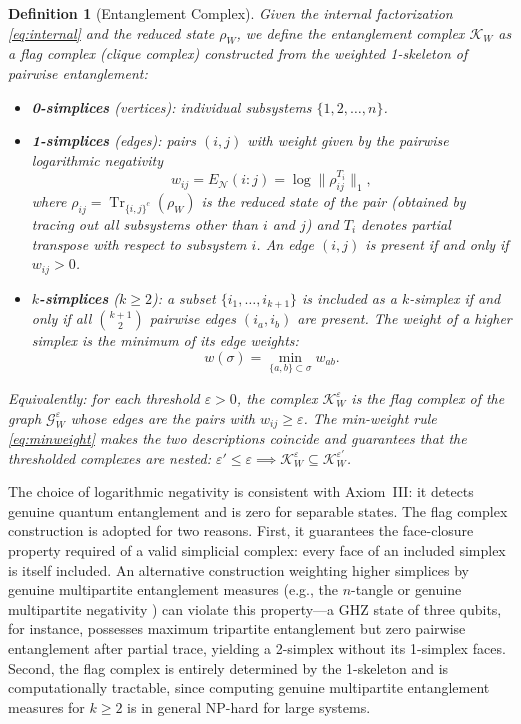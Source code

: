 \documentclass[11pt, a4paper]{article}
\newtheorem{definition}{Definition}
\begin{document}
\begin{definition}[Entanglement Complex]
\label{def:KW}
Given the internal factorization \eqref{eq:internal} and the reduced state $\rho_W$, we define the \emph{entanglement complex} $\mathcal{K}_W$ as a \emph{flag complex} (clique complex) constructed from the weighted 1-skeleton of pairwise entanglement:
\begin{itemize}
    \item \textbf{0-simplices} (vertices): individual subsystems $\{1, 2, \ldots, n\}$.
    \item \textbf{1-simplices} (edges): pairs $(i,j)$ with weight given by the pairwise logarithmic negativity
    \begin{equation}
    w_{ij} = E_{\mathcal{N}}(i{:}j) = \log \bigl\lVert \rho_{ij}^{T_i} \bigr\rVert_1,
    \label{eq:negativity}
    \end{equation}
    where $\rho_{ij} = \operatorname{Tr}_{\{i,j\}^c}(\rho_W)$ is the reduced state of the pair (obtained by tracing out all subsystems other than $i$ and $j$) and $T_i$ denotes partial transpose with respect to subsystem $i$. An edge $(i,j)$ is present if and only if $w_{ij} > 0$.
    \item \textbf{$k$-simplices} ($k \geq 2$): a subset $\{i_1, \ldots, i_{k+1}\}$ is included as a $k$-simplex if and only if all $\binom{k+1}{2}$ pairwise edges $(i_a, i_b)$ are present. The weight of a higher simplex is the minimum of its edge weights:
    \begin{equation}
    w(\sigma) = \min_{\{a,b\} \subset \sigma} w_{ab}.
    \label{eq:minweight}
    \end{equation}
\end{itemize}
Equivalently: for each threshold $\varepsilon > 0$, the complex $\mathcal{K}_W^\varepsilon$ is the flag complex of the graph $\mathcal{G}_W^\varepsilon$ whose edges are the pairs with $w_{ij} \geq \varepsilon$. The min-weight rule \eqref{eq:minweight} makes the two descriptions coincide and guarantees that the thresholded complexes are nested: $\varepsilon' \leq \varepsilon \implies \mathcal{K}_W^\varepsilon \subseteq \mathcal{K}_W^{\varepsilon'}$.
\end{definition}

The choice of logarithmic negativity is consistent with Axiom~III: it detects genuine quantum entanglement and is zero for separable states. The flag complex construction is adopted for two reasons. First, it guarantees the face-closure property required of a valid simplicial complex: every face of an included simplex is itself included. An alternative construction weighting higher simplices by genuine multipartite entanglement measures (e.g., the $n$-tangle \cite{Coffman2000} or genuine multipartite negativity \cite{Jungnitsch2011}) can violate this property---a GHZ state of three qubits, for instance, possesses maximum tripartite entanglement but zero pairwise entanglement after partial trace, yielding a 2-simplex without its 1-simplex faces. Second, the flag complex is entirely determined by the 1-skeleton and is computationally tractable, since computing genuine multipartite entanglement measures for $k \geq 2$ is in general NP-hard for large systems.
\end{document}
